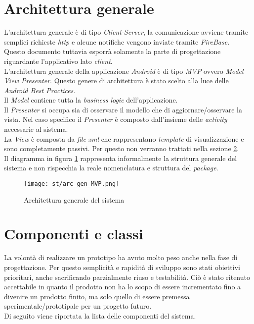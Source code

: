\section{Architettura generale}
L'architettura generale è di tipo \emph{Client-Server}, la comunicazione avviene tramite semplici richieste \emph{http} e alcune notifiche vengono inviate tramite \emph{FireBase}.\\
Questo documento tuttavia esporrà solamente la parte di progettazione riguardante l'applicativo lato \emph{client}.\\
L'architettura generale della applicazione \emph{Android} è di tipo \emph{MVP} ovvero \emph{Model View Presenter}. Questo genere di architettura è stato scelto alla luce delle \emph{Android Best Practices}.\\
Il \emph{Model} contiene tutta la \emph{business logic} dell'applicazione.\\
Il \emph{Presenter} si occupa sia di osservare il modello che di aggiornare/osservare la vista. Nel caso specifico il \emph{Presenter} è composto dall'insieme delle \emph{activity} necessarie al sistema.\\
La \emph{View} è composta da \emph{file} \emph{xml} che rappresentano \emph{template} di visualizzazione e sono completamente passivi. Per questo non verranno trattati nella sezione \ref{cap:componenti-classi}.\\
Il diagramma in figura \ref{fig:arc_generale} rappresenta informalmente la struttura generale del sistema e non rispecchia la reale nomenclatura e struttura del \emph{package}.
\begin{figure}[H] 
    \centering 
    \texttt{[image: st/arc\_gen\_MVP.png]} 
    \caption{Architettura generale del sistema}\label{fig:arc_generale}
\end{figure}



\section{Componenti e classi}\label{cap:componenti-classi}
La volontà di realizzare un prototipo ha avuto molto peso anche nella fase di progettazione. Per questo semplicità e rapidità di sviluppo sono stati obiettivi prioritari, anche sacrificando parzialmente riuso e testabilità. Ciò è stato ritenuto accettabile in quanto il prodotto non ha lo scopo di essere incrementato fino a divenire un prodotto finito, ma solo quello di essere premessa sperimentale/prototipale per un progetto futuro.\\
Di seguito viene riportata la lista delle componenti del sistema.

